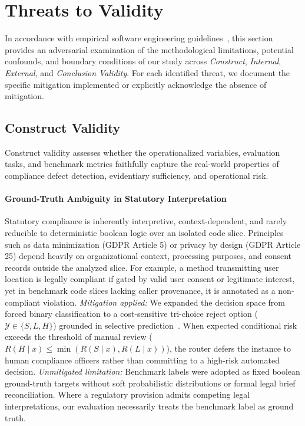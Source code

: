 \section{Threats to Validity}
\label{sec:threats_to_validity}

In accordance with empirical software engineering guidelines~\cite{wohlin2012experimentation}, this section provides an adversarial examination of the methodological limitations, potential confounds, and boundary conditions of our study across \textit{Construct}, \textit{Internal}, \textit{External}, and \textit{Conclusion Validity}. For each identified threat, we document the specific mitigation implemented or explicitly acknowledge the absence of mitigation.

\subsection{Construct Validity}
Construct validity assesses whether the operationalized variables, evaluation tasks, and benchmark metrics faithfully capture the real-world properties of compliance defect detection, evidentiary sufficiency, and operational risk.

\paragraph{Ground-Truth Ambiguity in Statutory Interpretation}
Statutory compliance is inherently interpretive, context-dependent, and rarely reducible to deterministic boolean logic over an isolated code slice. Principles such as data minimization (GDPR Article 5) or privacy by design (GDPR Article 25) depend heavily on organizational context, processing purposes, and consent records outside the analyzed slice. For example, a method transmitting user location is legally compliant if gated by valid user consent or legitimate interest, yet in benchmark code slices lacking caller provenance, it is annotated as a non-compliant violation.
\textit{Mitigation applied:} We expanded the decision space from forced binary classification to a cost-sensitive tri-choice reject option ($\mathcal{Y} \in \{S, L, H\}$) grounded in selective prediction~\cite{chow1970optimum}. When expected conditional risk exceeds the threshold of manual review ($R(H \mid x) \le \min(R(S \mid x), R(L \mid x))$), the router defers the instance to human compliance officers rather than committing to a high-risk automated decision.
\textit{Unmitigated limitation:} Benchmark labels were adopted as fixed boolean ground-truth targets without soft probabilistic distributions or formal legal brief reconciliation. Where a regulatory provision admits competing legal interpretations, our evaluation necessarily treats the benchmark label as ground truth.

